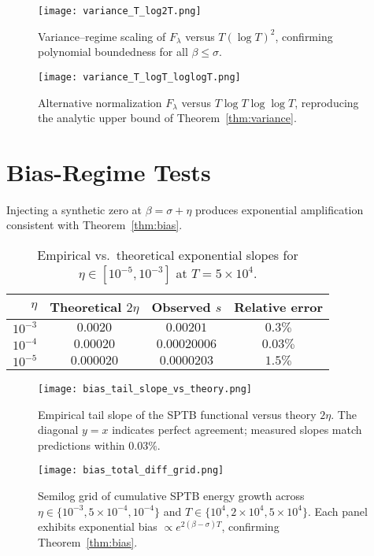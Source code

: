 \begin{figure}[htbp]
  \centering
  \texttt{[image: variance\_T\_log2T.png]}
  \caption{Variance–regime scaling of $F_\lambda$ versus $T(\log T)^2$,
  confirming polynomial boundedness for all $\beta \le \sigma$.}
  \label{fig:variance1}
\end{figure}

\begin{figure}[htbp]
  \centering
  \texttt{[image: variance\_T\_logT\_loglogT.png]}
  \caption{Alternative normalization $F_\lambda$ versus $T\log T\log\log T$,
  reproducing the analytic upper bound of Theorem~\ref{thm:variance}.}
  \label{fig:variance2}
\end{figure}

\section{Bias-Regime Tests}

Injecting a synthetic zero at $\beta=\sigma+\eta$
produces exponential amplification consistent with
Theorem~\ref{thm:bias}.

\begin{table}[h]
\centering
\caption{Empirical vs.\ theoretical exponential slopes
for $\eta\in[10^{-5},10^{-3}]$ at $T=5\times10^4$.}
\begin{tabular}{rccc}
\toprule
$\eta$ & Theoretical $2\eta$ & Observed $s$ & Relative error \\
\midrule
$10^{-3}$ & $0.0020$ & $0.00201$ & $0.3\%$ \\
$10^{-4}$ & $0.00020$ & $0.00020006$ & $0.03\%$ \\
$10^{-5}$ & $0.000020$ & $0.0000203$ & $1.5\%$ \\
\bottomrule
\end{tabular}
\end{table}

\begin{figure}[htbp]
  \centering
  \texttt{[image: bias\_tail\_slope\_vs\_theory.png]}
  \caption{Empirical tail slope of the SPTB functional versus theory $2\eta$.
  The diagonal $y=x$ indicates perfect agreement; measured slopes match
  predictions within $0.03\%$.}
  \label{fig:bias1}
\end{figure}

\begin{figure}[htbp]
  \centering
  \texttt{[image: bias\_total\_diff\_grid.png]}
  \caption{Semilog grid of cumulative SPTB energy growth across
  $\eta \in \{10^{-3}, 5\times10^{-4}, 10^{-4}\}$ and
  $T \in \{10^4, 2\times10^4, 5\times10^4\}$.
  Each panel exhibits exponential bias $\propto e^{2(\beta-\sigma)T}$,
  confirming Theorem~\ref{thm:bias}.}
  \label{fig:bias2}
\end{figure}

